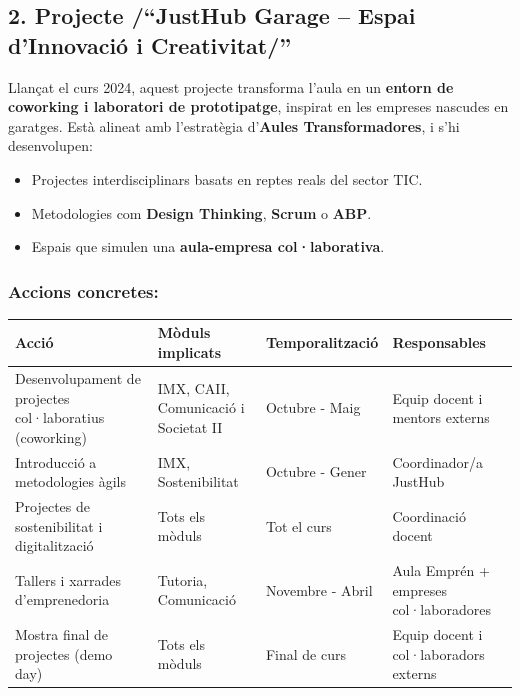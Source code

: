 \documentclass[
  paper=a4,
  ,captions=tableheading
]{scrartcl}
\providecommand{\tightlist}{%
  \setlength{\itemsep}{0pt}\setlength{\parskip}{0pt}}
\begin{document}
\hypertarget{projecte-justhub-garage-espai-dinnovaciuxf3-i-creativitat}{%
\subsection{2. Projecte /``JustHub Garage -- Espai d'Innovació i
Creativitat/''}\label{projecte-justhub-garage-espai-dinnovaciuxf3-i-creativitat}}

Llançat el curs 2024, aquest projecte transforma l'aula en un
\textbf{entorn de coworking i laboratori de prototipatge}, inspirat en
les empreses nascudes en garatges. Està alineat amb l'estratègia
d'\textbf{Aules Transformadores}, i s'hi desenvolupen:

\begin{itemize}
\tightlist
\item
  Projectes interdisciplinars basats en reptes reals del sector TIC.
\item
  Metodologies com \textbf{Design Thinking}, \textbf{Scrum} o
  \textbf{ABP}.
\item
  Espais que simulen una \textbf{aula-empresa col·laborativa}.
\end{itemize}

\hypertarget{accions-concretes}{%
\subsubsection{Accions concretes:}\label{accions-concretes}}

\begin{longtable}[]{@{}llll@{}}
\toprule
Acció & Mòduls implicats & Temporalització & Responsables \\
\midrule
\endhead
Desenvolupament de projectes col·laboratius (coworking) & IMX, CAII,
Comunicació i Societat II & Octubre - Maig & Equip docent i mentors
externs \\
Introducció a metodologies àgils & IMX, Sostenibilitat & Octubre - Gener
& Coordinador/a JustHub \\
Projectes de sostenibilitat i digitalització & Tots els mòduls & Tot el
curs & Coordinació docent \\
Tallers i xarrades d'emprenedoria & Tutoria, Comunicació & Novembre -
Abril & Aula Emprén + empreses col·laboradores \\
Mostra final de projectes (demo day) & Tots els mòduls & Final de curs &
Equip docent i col·laboradors externs \\
\bottomrule
\end{longtable}
\end{document}
